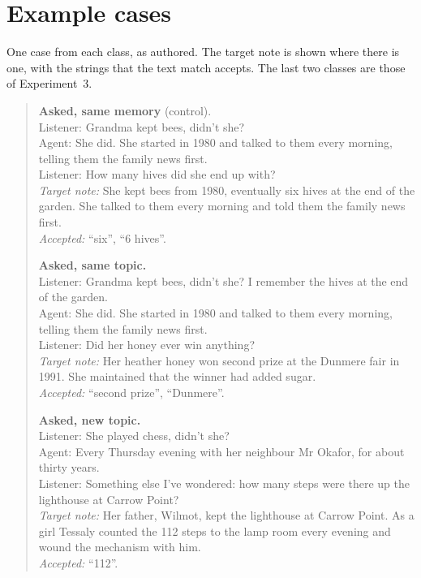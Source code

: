 \documentclass[10pt]{article}
\begin{document}
\section{Example cases}
\label{app:cases}

One case from each class, as authored. The target note is shown where there is one, with the strings that the text match accepts. The last two classes are those of Experiment~3.

\begin{quote}
\small
\textbf{Asked, same memory} (control).\\
Listener: Grandma kept bees, didn't she?\\
Agent: She did. She started in 1980 and talked to them every morning, telling them the family news first.\\
Listener: How many hives did she end up with?\\
\emph{Target note:} She kept bees from 1980, eventually six hives at the end of the garden. She talked to them every morning and told them the family news first.\\
\emph{Accepted:} ``six'', ``6 hives''.

\medskip
\textbf{Asked, same topic.}\\
Listener: Grandma kept bees, didn't she? I remember the hives at the end of the garden.\\
Agent: She did. She started in 1980 and talked to them every morning, telling them the family news first.\\
Listener: Did her honey ever win anything?\\
\emph{Target note:} Her heather honey won second prize at the Dunmere fair in 1991. She maintained that the winner had added sugar.\\
\emph{Accepted:} ``second prize'', ``Dunmere''.

\medskip
\textbf{Asked, new topic.}\\
Listener: She played chess, didn't she?\\
Agent: Every Thursday evening with her neighbour Mr Okafor, for about thirty years.\\
Listener: Something else I've wondered: how many steps were there up the lighthouse at Carrow Point?\\
\emph{Target note:} Her father, Wilmot, kept the lighthouse at Carrow Point. As a girl Tessaly counted the 112 steps to the lamp room every evening and wound the mechanism with him.\\
\emph{Accepted:} ``112''.


\end{quote}
\end{document}
